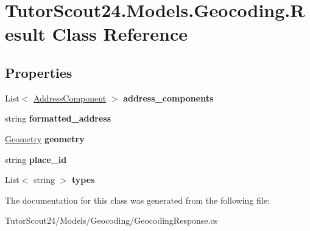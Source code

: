 \hypertarget{class_tutor_scout24_1_1_models_1_1_geocoding_1_1_result}{}\section{Tutor\+Scout24.\+Models.\+Geocoding.\+Result Class Reference}
\label{class_tutor_scout24_1_1_models_1_1_geocoding_1_1_result}
\subsection*{Properties}
\begin{DoxyCompactItemize}
\item 
\mbox{\label{class_tutor_scout24_1_1_models_1_1_geocoding_1_1_result_adeaf92ad8c58515bb256045b9c1ef73b}} 
List$<$ \mbox{\hyperlink{class_tutor_scout24_1_1_models_1_1_geocoding_1_1_address_component}{Address\+Component}} $>$ {\bfseries address\+\_\+components}
\item 
\mbox{\label{class_tutor_scout24_1_1_models_1_1_geocoding_1_1_result_acc071ca1a31b6a0904342640b1a35273}} 
string {\bfseries formatted\+\_\+address}
\item 
\mbox{\label{class_tutor_scout24_1_1_models_1_1_geocoding_1_1_result_a432b3fa7d94ec75e8bef6af2202d9f0e}} 
\mbox{\hyperlink{class_tutor_scout24_1_1_models_1_1_geocoding_1_1_geometry}{Geometry}} {\bfseries geometry}
\item 
\mbox{\label{class_tutor_scout24_1_1_models_1_1_geocoding_1_1_result_a6b3fce17b7f46ae1a8c9bae49cfbe082}} 
string {\bfseries place\+\_\+id}
\item 
\mbox{\label{class_tutor_scout24_1_1_models_1_1_geocoding_1_1_result_a00d426160b5b69ac40bf1e511d32042d}} 
List$<$ string $>$ {\bfseries types}
\end{DoxyCompactItemize}


The documentation for this class was generated from the following file\+:\begin{DoxyCompactItemize}
\item 
Tutor\+Scout24/\+Models/\+Geocoding/Geocoding\+Response.\+cs\end{DoxyCompactItemize}
